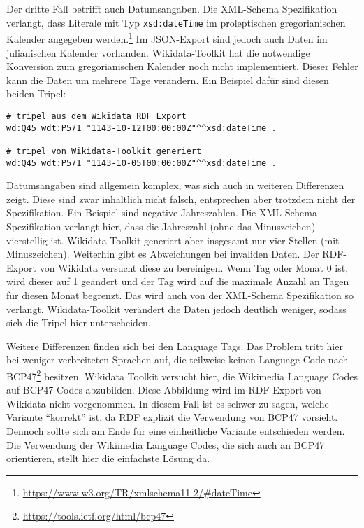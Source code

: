 Der dritte Fall betrifft auch Datumsangaben.
Die XML-Schema Spezifikation verlangt, dass Literale mit Typ \verb|xsd:dateTime| im proleptischen gregorianischen Kalender angegeben werden.\footnote{\url{https://www.w3.org/TR/xmlschema11-2/\#dateTime}}
Im JSON-Export sind jedoch auch Daten im julianischen Kalender vorhanden.
Wikidata-Toolkit hat die notwendige Konversion zum gregorianischen Kalender noch nicht implementiert.
Dieser Fehler kann die Daten um mehrere Tage verändern. Ein Beispiel dafür sind diesen beiden Tripel:
\begin{lstlisting}[language=SPARQL]
# tripel aus dem Wikidata RDF Export
wd:Q45 wdt:P571 "1143-10-12T00:00:00Z"^^xsd:dateTime .

# tripel von Wikidata-Toolkit generiert
wd:Q45 wdt:P571 "1143-10-05T00:00:00Z"^^xsd:dateTime .
\end{lstlisting}

Datumsangaben sind allgemein komplex, was sich auch in weiteren Differenzen zeigt. 
Diese sind zwar inhaltlich nicht falsch, entsprechen aber trotzdem nicht der Spezifikation.
Ein Beispiel sind negative Jahreszahlen.
Die XML Schema Spezifikation verlangt hier, dass die Jahreszahl (ohne das Minuszeichen) vierstellig ist.
Wikidata-Toolkit generiert aber insgesamt nur vier Stellen (mit Minuszeichen).
Weiterhin gibt es Abweichungen bei invaliden Daten.
Der RDF-Export von Wikidata versucht diese zu bereinigen.
Wenn Tag oder Monat 0 ist, wird dieser auf 1 geändert und der Tag wird auf die maximale Anzahl an Tagen für diesen Monat begrenzt.
Das wird auch von der XML-Schema Spezifikation so verlangt.
Wikidata-Toolkit verändert die Daten jedoch deutlich weniger, sodass sich die Tripel hier unterscheiden.

Weitere Differenzen finden sich bei den Language Tags.
Das Problem tritt hier bei weniger verbreiteten Sprachen auf, die teilweise keinen Language Code nach BCP47\footnote{\url{https://tools.ietf.org/html/bcp47}} besitzen.
Wikidata Toolkit versucht hier, die Wikimedia Language Codes auf BCP47 Codes abzubilden.
Diese Abbildung wird im RDF Export von Wikidata nicht vorgenommen.
In diesem Fall ist es schwer zu sagen, welche Variante ``korrekt'' ist, da RDF explizit die Verwendung von BCP47 vorsieht.
Dennoch sollte sich am Ende für eine einheitliche Variante entschieden werden.
Die Verwendung der Wikimedia Language Codes, die sich auch an BCP47 orientieren, stellt hier die einfachste Lösung da.

